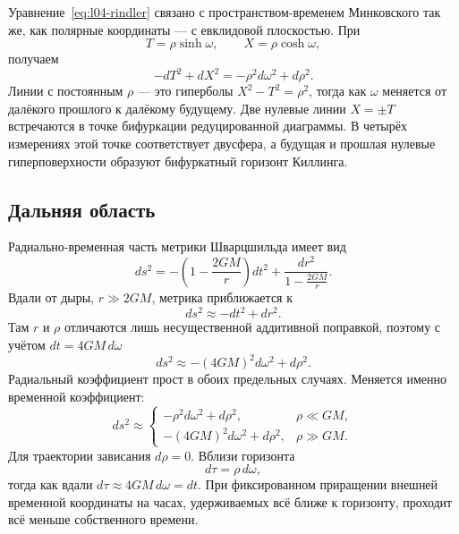 Уравнение~\eqref{eq:l04-rindler} связано с пространством-временем Минковского так же, как полярные координаты — с евклидовой плоскостью. При
\begin{equation}
T=\rho\sinh\omega,
\qquad
X=\rho\cosh\omega,
\end{equation}
получаем
\begin{equation}
-dT^2+dX^2=-\rho^2d\omega^2+d\rho^2.
\end{equation}
Линии с постоянным \(\rho\) — это гиперболы \(X^2-T^2=\rho^2\), тогда как \(\omega\) меняется от далёкого прошлого к далёкому будущему. Две нулевые линии \(X=\pm T\) встречаются в точке бифуркации редуцированной диаграммы. В четырёх измерениях этой точке соответствует двусфера, а будущая и прошлая нулевые гиперповерхности образуют бифуркатный горизонт Киллинга.

\subsection{Дальняя область}

Радиально-временная часть метрики Шварцшильда имеет вид
\begin{equation}
ds^2
=-\left(1-\frac{2GM}{r}\right)dt^2
+\frac{dr^2}{1-\frac{2GM}{r}}.
\label{eq:l04-schwarzschild}
\end{equation}
Вдали от дыры, \(r\gg2GM\), метрика приближается к
\begin{equation}
ds^2\approx-dt^2+dr^2.
\end{equation}
Там \(r\) и \(\rho\) отличаются лишь несущественной аддитивной поправкой, поэтому с учётом \(dt=4GM\,d\omega\)
\begin{equation}
ds^2\approx-(4GM)^2d\omega^2+d\rho^2.
\label{eq:l04-far}
\end{equation}
Радиальный коэффициент прост в обоих предельных случаях. Меняется именно временной коэффициент:
\begin{equation}
ds^2\approx
\begin{cases}
-\rho^2d\omega^2+d\rho^2, & \rho\ll GM,\\[3pt]
-(4GM)^2d\omega^2+d\rho^2, & \rho\gg GM.
\end{cases}
\label{eq:l04-two-limits}
\end{equation}
Для траектории зависания \(d\rho=0\). Вблизи горизонта
\begin{equation}
d\tau=\rho\,d\omega,
\end{equation}
тогда как вдали \(d\tau\approx4GM\,d\omega=dt\). При фиксированном приращении внешней временной координаты на часах, удерживаемых всё ближе к горизонту, проходит всё меньше собственного времени.

